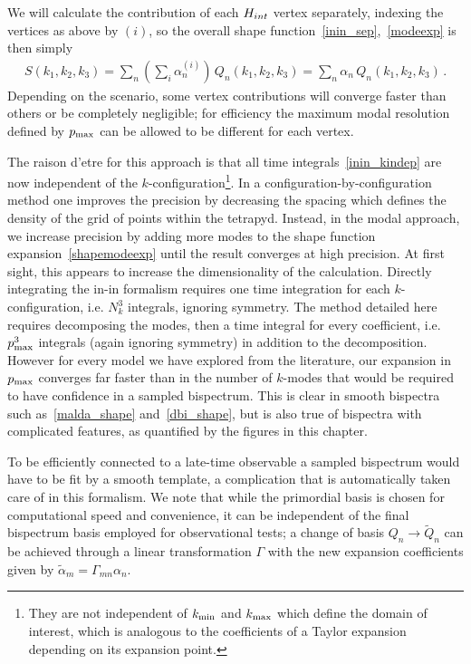 We will calculate the contribution of each $H_{int}$ vertex separately,
indexing the vertices as above by $(i)$, so the overall shape function~\eqref{inin_sep},~\eqref{modeexp} is then simply
\begin{eqnarray}\label{shapemodeexp}
    S(k_1, k_2,k_3) =   \sum_n \left(\sum_i \alpha_n^{(i)}\right) \, Q_n(k_1,k_2,k_3) =  \sum_n \alpha_n \, Q_n(k_1,k_2,k_3) \,.
\end{eqnarray}
Depending on the scenario,  some vertex contributions will converge faster than others 
or be completely negligible;
for efficiency the maximum modal resolution defined by $p_\text{max}$ can be allowed to be different
for each vertex.  
 

The raison d'etre for this approach is that all time integrals~\eqref{inin_kindep} are now independent of the $k$-configuration\footnote{
    They are not independent of ${k_\text{min}}$ and ${k_\text{max}}$ which define the domain of interest,
    which is analogous to the coefficients of a Taylor expansion depending on its expansion point.
}.
In a configuration-by-configuration method one improves the precision by
decreasing the spacing which defines the density of the grid of points within the tetrapyd.
Instead, in the modal approach, we increase precision by adding more modes to the shape function expansion~\eqref{shapemodeexp}
until the result converges at high precision.   At first sight, this appears to increase the dimensionality of the calculation.
Directly integrating the in-in formalism requires one time
integration for each $k$-configuration, i.e. $N_k^3$ integrals, ignoring symmetry.
The method detailed here requires decomposing the modes,
then a time integral for every coefficient, i.e. $p_\text{max}^3$ integrals
(again ignoring symmetry) in addition to the decomposition.
However for every model we have explored from the literature,
our expansion in $p_\text{max}$ converges far faster than in the number of
$k$-modes that would be required to have confidence in a sampled bispectrum.
This is clear in smooth bispectra such as~\eqref{malda_shape} and~\eqref{dbi_shape},
but is also true of bispectra with complicated features,
as quantified by the figures in this chapter.

To be efficiently connected to a late-time observable
a sampled bispectrum would have to be fit by a smooth template,
a complication that is automatically taken care of in this formalism.
We note that while the primordial basis is chosen for computational speed and convenience, it can be 
independent of the final bispectrum basis employed for observational tests; a change of basis $Q_n\rightarrow \tilde Q_n$ can be achieved through a linear transformation $\Gamma$ with the new expansion coefficients given by $\tilde \alpha_m = \Gamma_{mn}\alpha_n$. 


